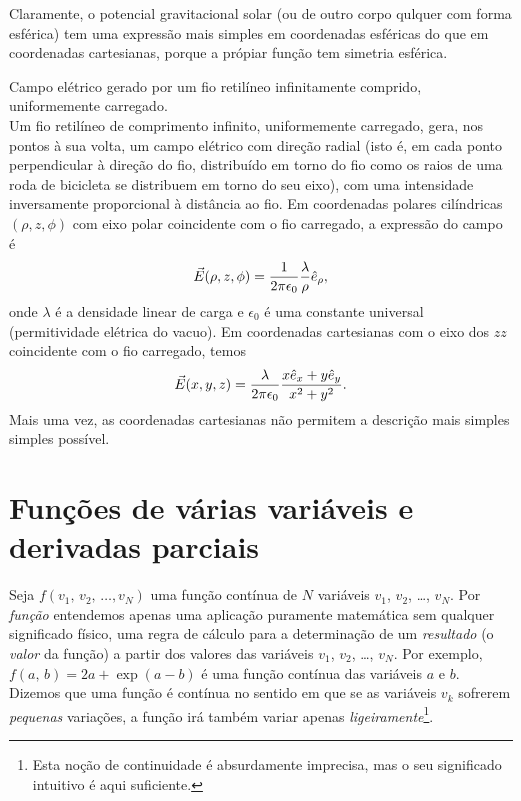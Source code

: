 \begin{examples}
  Claramente, o potencial gravitacional solar (ou de outro corpo qulquer com
  forma esférica) tem uma expressão mais simples em coordenadas esféricas do que
  em coordenadas cartesianas, porque a própiar função tem simetria esférica.
\item
  Campo elétrico gerado por um fio retilíneo infinitamente comprido,
  uniformemente carregado.\\
  Um fio retilíneo de comprimento infinito, uniformemente carregado, gera, nos
  pontos à sua volta, um campo elétrico com direção radial (isto é, em cada
  ponto perpendicular à direção do fio, distribuído em torno do fio como os
  raios de uma roda de bicicleta se distribuem em torno do seu eixo), com uma
  intensidade inversamente proporcional à distância ao fio. Em coordenadas
  polares cilíndricas $(\rho,z,\phi)$ com eixo polar coincidente com o fio
  carregado, a expressão do campo é
  \begin{equation*}
    \vec E(\rho,z,\phi)=\frac{1}{2\pi\epsilon_0}\frac{\lambda}{\rho}\he_\rho,
  \end{equation*}
  onde $\lambda$ é a densidade linear de carga e $\epsilon_0$ é uma constante
  universal (permitividade elétrica do vacuo).
  Em coordenadas cartesianas com o eixo dos $zz$ coincidente com o fio
  carregado, temos
  \begin{equation*}
    \vec E(x,y,z)=\frac{\lambda}{2\pi\epsilon_0}\frac{x\he_x+y\he_y}{x^2+y^2}.
  \end{equation*}
  Mais uma vez, as coordenadas cartesianas não permitem a descrição mais simples
  simples possível.
\end{examples}

\section{Funções de várias variáveis e derivadas parciais}
Seja $f(v_1,\,v_2,\,\ldots,v_N)$ uma função contínua de $N$ variáveis $v_1$,
$v_2$, \ldots, $v_N$. Por \emph{função} entendemos apenas uma aplicação
puramente matemática sem qualquer significado físico, uma regra de cálculo
para a determinação de um \emph{resultado} (o \emph{valor} da função) a partir
dos valores das variáveis $v_1$, $v_2$, \ldots, $v_N$. Por exemplo, 
$f(a,\,b)=2a+\exp(a-b)$ é uma função contínua das variáveis $a$ e $b$. Dizemos
que uma função é contínua no sentido em que se as variáveis $v_k$ sofrerem
\emph{pequenas} variações, a função irá também variar apenas
\emph{ligeiramente}\footnote{Esta noção de continuidade é absurdamente
imprecisa, mas o seu significado intuitivo é aqui suficiente.}.

